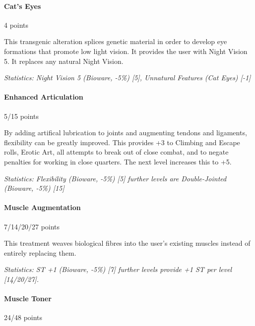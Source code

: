 \begin{multicols*}{3}
	\paragraph{Cat's Eyes}
	\begin{flushright}
		4 points
	\end{flushright}
	
	This transgenic alteration splices genetic material in order to develop eye formations that promote low light vision. It provides the user with Night Vision 5. It replaces any natural Night Vision.
	
	\textit{\textcolor{OliveGreen}{Statistics: Night Vision 5 (Bioware, -5\%) [5], Unnatural Features (Cat Eyes) [-1]}}
	
	\paragraph{Enhanced Articulation}
	\begin{flushright}
		5/15 points
	\end{flushright}
	
	By adding artifical lubrication to joints and augmenting tendons and ligaments, flexibility can be greatly improved. This provides +3 to Climbing and Escape rolls, Erotic Art, all attempts to break out of close combat, and to negate penalties for working in close quarters. The next level increases this to +5.
	
	\textit{\textcolor{OliveGreen}{Statistics: Flexibility (Bioware, -5\%) [5] further levels are Double-Jointed (Bioware, -5\%) [15]}}
	
	\paragraph{Muscle Augmentation}
	\begin{flushright}
		7/14/20/27 points
	\end{flushright}
	
	This treatment weaves biological fibres into the user's existing muscles instead of entirely replacing them.
	
	\textit{\textcolor{OliveGreen}{Statistics: ST +1 (Bioware, -5\%) [7] further levels provide +1 ST per level [14/20/27].}}
	
	\paragraph{Muscle Toner}
	\begin{flushright}
		24/48 points
	\end{flushright}
	

\end{multicols*}
